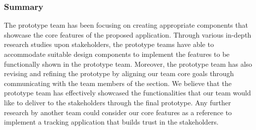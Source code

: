     \subsubsection{Summary}
      \par The prototype team has been focusing on creating appropriate components that showcase the core features of the proposed application. Through various in-depth research studies upon stakeholders, the prototype teams have able to accommodate suitable design components to implement the features to be functionally shown in the prototype team. Moreover, the prototype team has also revising and refining the prototype by aligning our team core goals through communicating with the team members of the section. We believe that the prototype team has effectively showcased the functionalities that our team would like to deliver to the stakeholders through the final prototype. Any further research by another team could consider our core features as a reference to implement a tracking application that builds trust in the stakeholders.